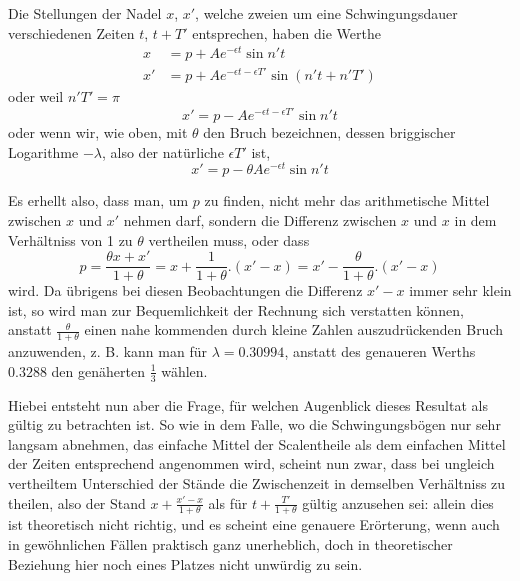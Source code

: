 Die Stellungen der Nadel $x$, $x'$, welche zweien um eine Schwingungsdauer verschiedenen Zeiten $t$, $t+T'$ entsprechen, haben die Werthe
\[
\begin{aligned}
x&=p+Ae^{-\epsilon t}\sin n't\\
x'&=p+Ae^{-\epsilon t-\epsilon T'}\sin(n't+n'T')
\end{aligned}
\]
oder weil $n'T'=\pi$
\[
x'=p-Ae^{-\epsilon t-\epsilon T'}\sin n't
\]
oder wenn wir, wie oben, mit $\theta$ den Bruch bezeichnen, dessen briggischer Logarithme $-\lambda$, also der natürliche $\epsilon T'$ ist,
\[
x'=p-\theta Ae^{-\epsilon t}\sin n't
\]

Es erhellt also, dass man, um $p$ zu finden, nicht mehr das arithmetische Mittel zwischen $x$ und $x'$ nehmen darf, sondern die Differenz zwischen $x$ und $x$ in dem Verhältniss von 1 zu $\theta$ vertheilen muss, oder dass
\[
p=\frac{\theta x+x'}{1+\theta}=x+\frac{1}{1+\theta}.(x'-x)=x'-\frac{\theta}{1+\theta}.(x'-x)
\]
wird. Da übrigens bei diesen Beobachtungen die Differenz $x'-x$ immer sehr klein ist, so wird man zur Bequemlichkeit der Rechnung sich verstatten können, anstatt $\frac{\theta}{1+\theta}$ einen nahe kommenden durch kleine Zahlen auszudrückenden Bruch
anzuwenden, z. B. kann man für $\lambda=0.30994$, anstatt des genaueren Werths $0.3288$ den genäherten $\tfrac13$ wählen.

Hiebei entsteht nun aber die Frage, für welchen Augenblick dieses Resultat als gültig zu betrachten ist. So wie in dem Falle, wo die Schwingungsbögen nur sehr langsam abnehmen, das einfache Mittel der Scalentheile als dem einfachen Mittel der Zeiten entsprechend angenommen wird, scheint nun zwar, dass bei ungleich vertheiltem Unterschied der Stände die Zwischenzeit in demselben Verhältniss zu theilen, also der Stand $x+\frac{x'-x}{1+\theta}$ als für $t+\frac{T'}{1+\theta}$ gültig anzusehen sei: allein dies ist theoretisch nicht richtig, und es scheint eine genauere Erörterung, wenn auch in gewöhnlichen Fällen praktisch ganz unerheblich, doch in theoretischer Beziehung hier noch eines Platzes nicht unwürdig zu sein.

